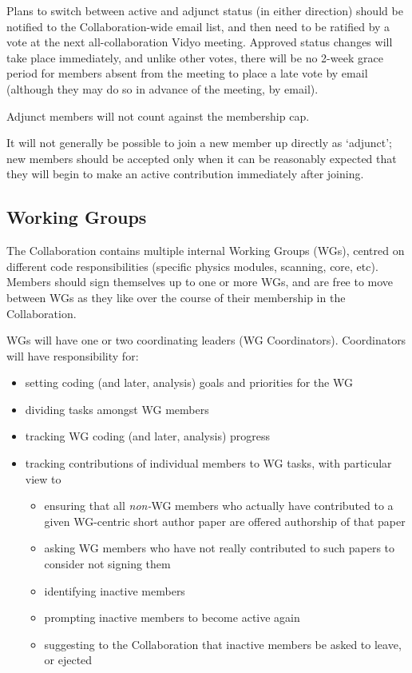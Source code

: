 Plans to switch between active and adjunct status (in either direction) should be notified to the Collaboration-wide email list, and then need to be ratified by a vote at the next all-collaboration Vidyo meeting.  Approved status changes will take place immediately, and unlike other votes, there will be no 2-week grace period for members absent from the meeting to place a late vote by email (although they may do so in advance of the meeting, by email).

Adjunct members will not count against the membership cap.

It will not generally be possible to join a new member up directly as `adjunct'; new members should be accepted only when it can be reasonably expected that they will begin to make an active contribution immediately after joining.

\subsection{Working Groups}

The Collaboration contains multiple internal Working Groups (WGs), centred on different code responsibilities (specific physics modules, scanning, core, etc).  Members should sign themselves up to one or more WGs, and are free to move between WGs as they like over the course of their membership in the Collaboration.

WGs will have one or two coordinating leaders (WG Coordinators).  Coordinators will have responsibility for:
\begin{itemize}
  \item setting coding (and later, analysis) goals and priorities for the WG
  \item dividing tasks amongst WG members
  \item tracking WG coding (and later, analysis) progress
  \item tracking contributions of individual members to WG tasks, with particular view to\begin{itemize}
  \item ensuring that all \textit{non-}WG members who actually have contributed to a given WG-centric short author paper are offered authorship of that paper
  \item asking WG members who have not really contributed to such papers to consider not signing them
  \item identifying inactive members 
  \item prompting inactive members to become active again
  \item suggesting to the Collaboration that inactive members be asked to leave, or ejected 
  \end{itemize}
\end{itemize}

